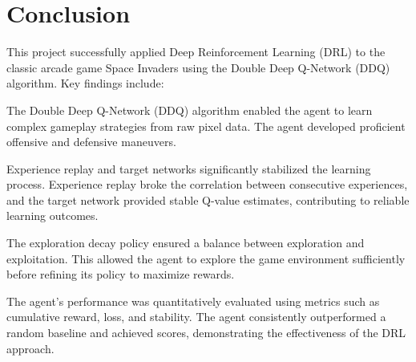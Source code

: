 \documentclass[preprint,12pt,3p,times]{elsarticle}
\begin{document}
\section{Conclusion}

This project successfully applied Deep Reinforcement Learning (DRL) to the classic arcade game Space Invaders using the Double Deep Q-Network (DDQ) algorithm. Key findings include:

The Double Deep Q-Network (DDQ) algorithm enabled the agent to learn complex gameplay strategies from raw pixel data. The agent developed proficient offensive and defensive maneuvers.

Experience replay and target networks significantly stabilized the learning process. Experience replay broke the correlation between consecutive experiences, and the target network provided stable Q-value estimates, contributing to reliable learning outcomes.

The exploration decay policy ensured a balance between exploration and exploitation. This allowed the agent to explore the game environment sufficiently before refining its policy to maximize rewards.

The agent’s performance was quantitatively evaluated using metrics such as cumulative reward, loss, and stability. The agent consistently outperformed a random baseline and achieved scores, demonstrating the effectiveness of the DRL approach.

\newpage



\end{document}
